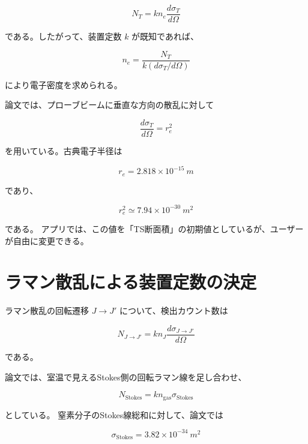 \documentclass[11pt]{ltjsarticle}
\begin{document}
\begin{equation}
N_T = k n_e \frac{d\sigma_T}{d\Omega}
\end{equation}

である。したがって、装置定数 $k$ が既知であれば、

\begin{equation}
n_e =
\frac{N_T}
{k (d\sigma_T/d\Omega)}
\end{equation}

により電子密度を求められる。

論文では、プローブビームに垂直な方向の散乱に対して

\begin{equation}
\frac{d\sigma_T}{d\Omega}=r_e^2
\end{equation}

を用いている。古典電子半径は

\begin{equation}
r_e = 2.818 \times 10^{-15} \ \si{m}
\end{equation}

であり、

\begin{equation}
r_e^2 \simeq 7.94 \times 10^{-30} \ \si{m^2}
\end{equation}

である。
アプリでは、この値を「TS断面積」の初期値としているが、ユーザーが自由に変更できる。

\section{ラマン散乱による装置定数の決定}

ラマン散乱の回転遷移 $J\to J'$ について、検出カウント数は

\begin{equation}
N_{J\to J'}
=
k n_J
\frac{d\sigma_{J\to J'}}{d\Omega}
\end{equation}

である。

論文では、室温で見えるStokes側の回転ラマン線を足し合わせ、

\begin{equation}
N_{\mathrm{Stokes}}
=
k n_{\mathrm{gas}} \sigma_{\mathrm{Stokes}}
\end{equation}

としている。
窒素分子のStokes線総和に対して、論文では

\begin{equation}
\sigma_{\mathrm{Stokes}}
=
3.82 \times 10^{-34} \ \si{m^2}
\end{equation}
\end{document}
